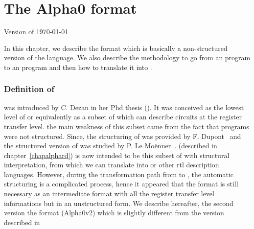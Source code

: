\chapter{The Alpha0 format}
\label{chapalfha0}

{\sc Version of \today}

In this chapter, we describe the {} format which is basically a non-structured version of the {\AlpHard} language. We also 
 describe the methodology to go from an {\Alpha} program to an {} program and then how to translate it into {\AlpHard}. 

\subsection{Definition of {\AlphaZ}}
{\AlphaZ} was introduced by C. Dezan in her Phd thesis
(\cite{dezan}). It was conceived as the lowest level of {\Alpha} or
equivalently as a subset of {\Alpha} which can describe circuits at the 
register transfer level. the main weakness of this subset came from the fact
that {\Alpha} programs were not structured.  Since, the structuring of
{\Alpha} was provided by F. Dupont~\cite{DupontQuRi95} and the
structured version of {\AlphaZ} was studied by P. Le
Mo\"enner~\cite{Patricia96}.  {\AlpHard} (described in
chapter~\ref{chapalphard}) is now intended to be this subset of
{\Alpha} with structural interpretation, from which we can translate
{\Alpha} into {\vhdl} or other {\sc rtl} description
languages. However, during the transformation path from {\Alpha} to
{\AlpHard}, the automatic structuring is a complicated process, hence
it appeared that the {\AlphaZ} format is still necessary as an
intermediate format with all the register transfer level informations
but in an unstructured form. We describe hereafter, the second version
 the {\AlphaZ} format (Alpha0v2) which is slightly different from the version described in~\cite{dezan}



